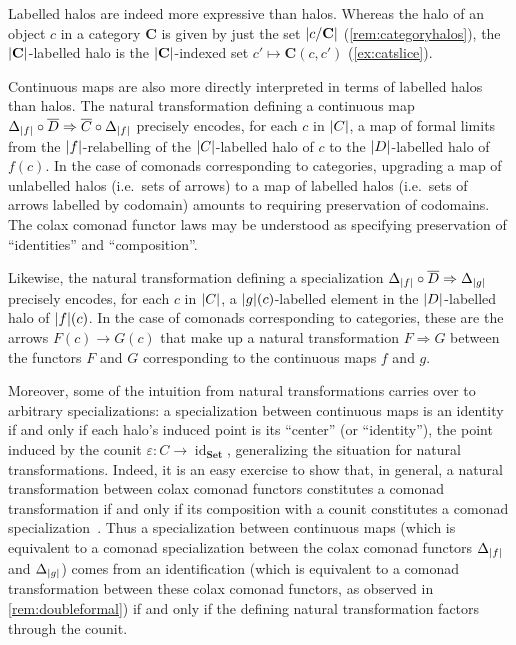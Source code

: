 \documentclass[11pt, oneside, article]{memoir}
\theoremstyle{plain}
\theoremstyle{definition}
\theoremstyle{remark}
\newenvironment{remark}
{\renewcommand\qedsymbol{$\lrcorner$}%
  \pushQED{\qed}\myremark}
{\popQED\endmyremark}
\DeclareMathOperator{\id}{id}
\DeclarePairedDelimiter{\abs}{\lvert}{\rvert}
\newcommand{\namedcat}[1]{\mathbf{#1}}
\newcommand{\cat}[1]{\mathbf{#1}}
\newcommand{\Set}{\namedcat{Set}}
\newcommand{\clift}[1]{\overline{#1}}
\newcommand{\pts}[1]{{\abs{#1}}}
\newcommand{\obs}[1]{\pts{#1}}
\newcommand{\one}[1]{\pts{#1}}
\newcommand{\reindex}[1]{\Delta_{#1}}
\newcommand{\Ho}[1]{#1}
\newcommand{\cmnd}[1]{{#1}}
\newcommand{\cC}{\cmnd{C}}
\newcommand{\cD}{\cmnd{D}}
\newcommand{\bC}{\cat{C}}
\newcommand{\idSet}{\id_\Set}
\begin{document}
\begin{remark}[Functors and natural transformations]\label{rem:halonat}
  Labelled halos are indeed more expressive than halos. Whereas the
  halo of an object $c$ in a category $\bC$ is given by just the set
  $\obs{c / \bC}$ (\cref{rem:categoryhalos}), the $\obs{\bC}$-labelled halo
  is the $\obs{\bC}$-indexed set $c' \mapsto \Ho{\bC}(c, c')$
  (\cref{ex:catslice}).
  
  Continuous maps are also more directly interpreted in terms of
  labelled halos than halos. The natural transformation defining a
  continuous map
  $\reindex{\one{f}} \circ \clift{\cD} \Rightarrow \clift{\cC} \circ
  \reindex{\one{f}}$ precisely encodes, for each $c$ in $\pts{\cC}$, a
  map of formal limits from the $\one{f}$-relabelling of the
  $\pts{\cC}$-labelled halo of $c$ to the $\pts{\cD}$-labelled halo of
  $f(c)$. In the case of comonads corresponding to categories,
  upgrading a map of unlabelled halos (i.e.\ sets of arrows) to a map
  of labelled halos (i.e.\ sets of arrows labelled by codomain)
  amounts to requiring preservation of codomains. The colax comonad
  functor laws may be understood as specifying preservation of
  ``identities'' and ``composition''.

  Likewise, the natural transformation defining a specialization
  $\reindex{\one{f}} \circ \clift{\cD} \Rightarrow \reindex{\one{g}}$
  precisely encodes, for each $c$ in $\pts{\cC}$, a
  $\one{g}(c)$-labelled element in the $\pts{D}$-labelled halo of
  $\one{f}(c)$. In the case of comonads corresponding to categories,
  these are the arrows $F(c) \to G(c)$ that make up a natural
  transformation $F \Rightarrow G$ between the functors $F$ and $G$
  corresponding to the continuous maps $f$ and $g$.

  Moreover, some of the intuition from natural transformations carries
  over to arbitrary specializations: a specialization between
  continuous maps is an identity if and only if each halo's induced
  point is its ``center'' (or ``identity''), the point induced by the
  counit $\varepsilon \colon \cC \rightarrow \idSet$, generalizing the
  situation for natural transformations.  Indeed, it is an easy
  exercise to show that, in general, a natural transformation between
  colax comonad functors constitutes a comonad transformation if and
  only if its composition with a counit constitutes a comonad
  specialization~\cite[Remark 3.3]{fairbanks:monads}. Thus a
  specialization between continuous maps (which is equivalent to a
  comonad specialization between the colax comonad functors
  $\reindex{\one{f}}$ and $\reindex{\one{g}}$) comes from an
  identification (which is equivalent to a comonad transformation
  between these colax comonad functors, as observed in
  \cref{rem:doubleformal}) if and only if the defining natural
  transformation factors through the counit.
\end{remark}
\end{document}
